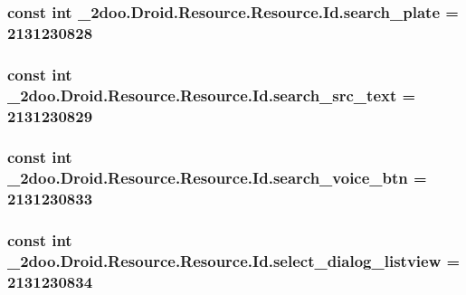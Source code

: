 \hypertarget{class__2doo_1_1_droid_1_1_resource_1_1_id_180dff1cb943b5061634158fb92c31cc}{
\subsubsection[{search\_\-plate}]{\setlength{\rightskip}{0pt plus 5cm}const int \_\-2doo.Droid.Resource.Resource.Id.search\_\-plate = 2131230828}}
\label{class__2doo_1_1_droid_1_1_resource_1_1_id_180dff1cb943b5061634158fb92c31cc}


\hypertarget{class__2doo_1_1_droid_1_1_resource_1_1_id_1739454c42e7cfd04d0b29c4ff1f7b36}{
\subsubsection[{search\_\-src\_\-text}]{\setlength{\rightskip}{0pt plus 5cm}const int \_\-2doo.Droid.Resource.Resource.Id.search\_\-src\_\-text = 2131230829}}
\label{class__2doo_1_1_droid_1_1_resource_1_1_id_1739454c42e7cfd04d0b29c4ff1f7b36}


\hypertarget{class__2doo_1_1_droid_1_1_resource_1_1_id_02a9fd3bbc0535fcc69c5fb9a12a8417}{
\subsubsection[{search\_\-voice\_\-btn}]{\setlength{\rightskip}{0pt plus 5cm}const int \_\-2doo.Droid.Resource.Resource.Id.search\_\-voice\_\-btn = 2131230833}}
\label{class__2doo_1_1_droid_1_1_resource_1_1_id_02a9fd3bbc0535fcc69c5fb9a12a8417}


\hypertarget{class__2doo_1_1_droid_1_1_resource_1_1_id_a752dcd26c85eb8c499c1e89159e88eb}{
\subsubsection[{select\_\-dialog\_\-listview}]{\setlength{\rightskip}{0pt plus 5cm}const int \_\-2doo.Droid.Resource.Resource.Id.select\_\-dialog\_\-listview = 2131230834}}
\label{class__2doo_1_1_droid_1_1_resource_1_1_id_a752dcd26c85eb8c499c1e89159e88eb}


